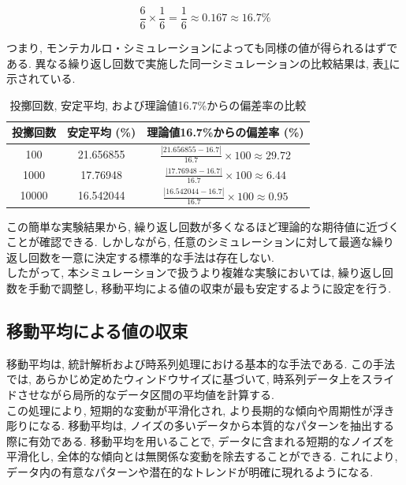 \documentclass[a4j, 12pt ]{jarticle}
\begin{document}
\[
\frac{6}{6} \times \frac{1}{6} = \frac{1}{6} \approx 0.167 \approx 16.7\%
\]

つまり, モンテカルロ・シミュレーションによっても同様の値が得られるはずである. 異なる繰り返し回数で実施した同一シミュレーションの比較結果は, 表\ref{table:throw_count_comparison}に示されている.\\

\begin{table}[H]
  \centering
  \caption{投擲回数, 安定平均, および理論値16.7\%からの偏差率の比較}\label{table:throw_count_comparison}
  \begin{tabular}{|c|c|c|}
    \hline
    投擲回数 & 安定平均 (\%) & 理論値16.7\%からの偏差率 (\%) \\
    \hline
    100 & 21.656855 & \(\frac{|21.656855 - 16.7|}{16.7} \times 100 \approx 29.72\) \\
    1000 & 17.76948 & \(\frac{|17.76948 - 16.7|}{16.7} \times 100 \approx 6.44\) \\
    10000 & 16.542044 & \(\frac{|16.542044 - 16.7|}{16.7} \times 100 \approx 0.95\) \\
    \hline
  \end{tabular}
\end{table}
この簡単な実験結果から, 繰り返し回数が多くなるほど理論的な期待値に近づくことが確認できる. しかしながら, 任意のシミュレーションに対して最適な繰り返し回数を一意に決定する標準的な手法は存在しない.\\

したがって, 本シミュレーションで扱うより複雑な実験においては, 繰り返し回数を手動で調整し, 移動平均による値の収束が最も安定するように設定を行う.\\
\subsection{移動平均による値の収束}
移動平均は, 統計解析および時系列処理における基本的な手法である. この手法では, あらかじめ定めたウィンドウサイズに基づいて, 時系列データ上をスライドさせながら局所的なデータ区間の平均値を計算する.\\

この処理により, 短期的な変動が平滑化され, より長期的な傾向や周期性が浮き彫りになる. 移動平均は, ノイズの多いデータから本質的なパターンを抽出する際に有効である. 移動平均を用いることで, データに含まれる短期的なノイズを平滑化し, 全体的な傾向とは無関係な変動を除去することができる. これにより, データ内の有意なパターンや潜在的なトレンドが明確に現れるようになる.\cite{majka2024MA}\\
\end{document}
